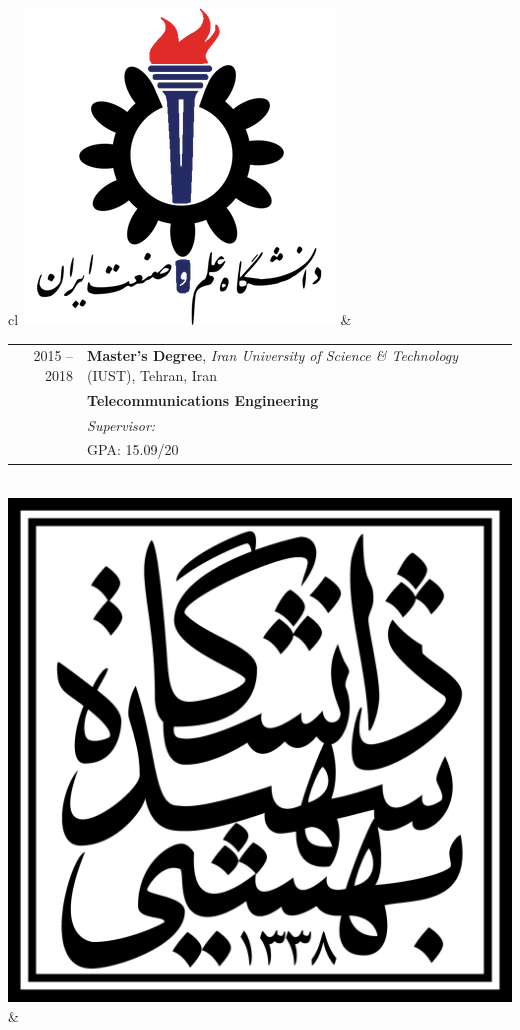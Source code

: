 
\begin{tabular}{cl}
	\includegraphics[scale=0.12]{graphics/IUST_logo_color} & 
	\begin{tabular}{rl}
		\textsc{2015 --2018} & \textbf{Master’s Degree},  \emph{Iran University of Science \& Technology} (IUST),  Tehran, Iran             \\
		                     & \textbf{Telecommunications Engineering}                                                                      \\
		                     & \emph{Supervisor: \link{http://www.iust.ac.ir/content/45110/Dr.-Haddadi}{Assistant Professor Farzan Haddadi}} \\
		                     & \textsc{GPA}: 15.09/20                                                                                       \\
	\end{tabular}
	\\
	\includegraphics[scale=0.05]{graphics/SBU_logo}        & 

\end{tabular}
